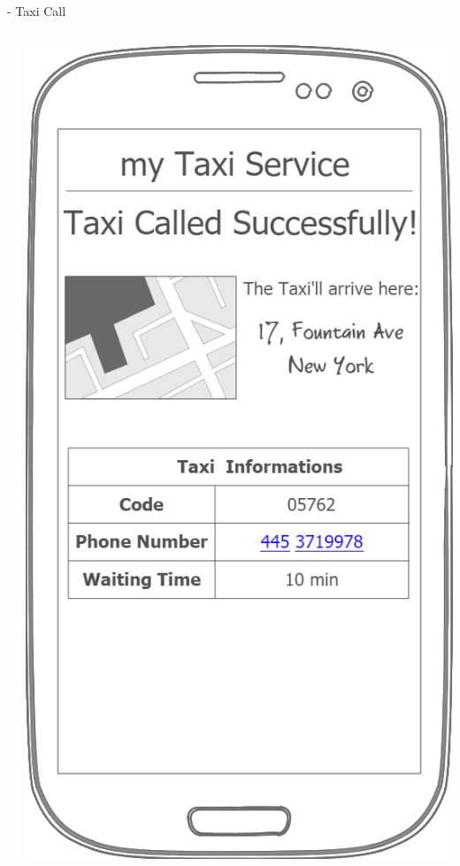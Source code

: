 \documentclass[9pt]{beamer}
\makeatletter
\newcommand*{\currentname}{\@currentlabelname}
\makeatother
\begin{document}
\begin{frame}{\currentname{} - Taxi Call}
\begin{columns}[c]
\begin{column}{.5\textwidth}
		\centering
  \end{column}
  \begin{column}{.5\textwidth}
    \includegraphics[height=.8\textheight]{Mockup-ClientsTaxiCallConfirmation}
		\centering
  \end{column}
\end{columns}
\end{frame}
\end{document}
